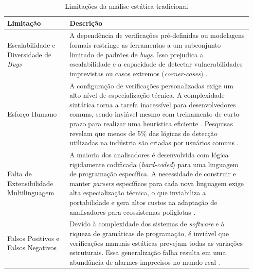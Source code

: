 \documentclass[
    12pt,                %
    openright,           %
    oneside,             %
    a4paper,             %
    english,             %
    brazil               %
]{abntex2}
\begin{document}
\begin{itemize}
\begin{table}[htb]
    \centering
    \caption{Limitações da análise estática tradicional}
    \label{tab:limitacoes_analise_trad}
    \begin{tabular}{p{3.5cm}|p{11.5cm}}
        \toprule
        \textbf{Limitação} & \textbf{Descrição} \\
        \midrule
        Escalabilidade e Diversidade de \textit{Bugs} & 
        A dependência de verificações pré-definidas ou modelagens formais restringe as ferramentas a um subconjunto limitado de padrões de \textit{bugs}.
        Isso prejudica a escalabilidade e a capacidade de detectar vulnerabilidades imprevistas ou casos extremos (\textit{corner-cases}) \cite{yang2025knighter}. \\
        \midrule
        Esforço Humano & 
        A configuração de verificações personalizadas exige um alto nível de especialização técnica. 
        A complexidade sintática torna a tarefa inacessível para desenvolvedores comuns, sendo inviável mesmo com treinamento de curto prazo para realizar uma heurística eficiente \cite{hou2025generation}.
        Pesquisas revelam que menos de 5\% das lógicas de detecção utilizadas na indústria são criadas por usuários comuns \cite{hou2025generation}. \\
        \midrule
        Falta de Extensibilidade Multilinguagem &
        A maioria dos analisadores é desenvolvida com lógica rigidamente codificada (\textit{hard-coded}) para uma linguagem de programação específica. 
        A necessidade de construir e manter \textit{parsers} específicos para cada nova linguagem exige alta especialização técnica, o que inviabiliza a portabilidade e gera altos custos na adaptação de analisadores para ecossistemas poliglotas \cite{hou2025generation}. \\
        \midrule
        Falsos Positivos e Falsos Negativos & 
        Devido à complexidade dos sistemas de \textit{software} e à riqueza de gramáticas de programação, é inviável que verificações manuais estáticas prevejam todas as variações estruturais. 
        Essa generalização falha resulta em uma abundância de alarmes imprecisos no mundo real \cite{jiang2025factaligned}. \\
        \bottomrule
    \end{tabular}
\end{table}


\end{itemize}
\end{document}
